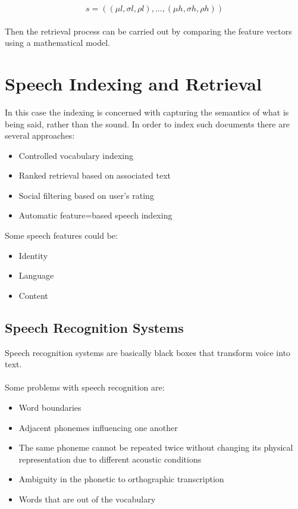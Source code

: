 \documentclass{article}
\begin{document}
\[ s = ((\mu l, \sigma l, \rho l), ..., (\mu h, \sigma h, \rho h)) \] \\
Then the retrieval process can be carried out by comparing the feature vectors using a mathematical model.

\section{Speech Indexing and Retrieval}
In this case the indexing is concerned with capturing the semantics of what is being said, rather than the sound. In order to index such documents there are several approaches:

\begin{itemize}
	\item Controlled vocabulary indexing
	\item Ranked retrieval based on associated text
	\item Social filtering based on user's rating
	\item Automatic feature=based speech indexing
\end{itemize}
Some speech features could be:

\begin{itemize}
	\item Identity
	\item Language
	\item Content
\end{itemize}

\subsection{Speech Recognition Systems}
Speech recognition systems are basically black boxes that transform voice into text. \\ \\
Some problems with speech recognition are:

\begin{itemize}
	\item Word boundaries
	\item Adjacent phonemes influencing one another
	\item The same phoneme cannot be repeated twice without changing its physical representation due to different acoustic conditions
	\item Ambiguity in the phonetic to orthographic transcription
	\item Words that are out of the vocabulary
\end{itemize}
\end{document}

